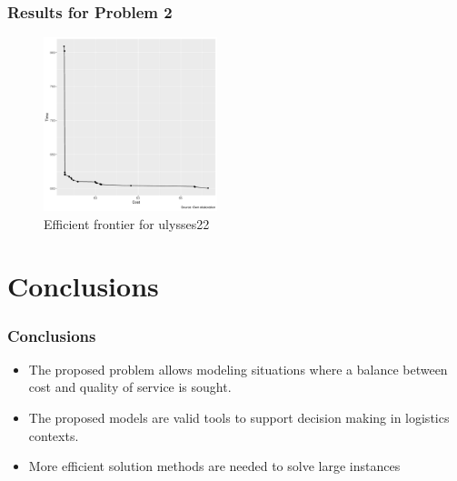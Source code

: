 \documentclass[aspectratio=169]{beamer}
\begin{document}
{\begin{frame}
\frametitle{Results for Problem 2}

\begin{figure}[ht]
\centering
\includegraphics[width=0.45\textwidth]{images/efficient-frontier:3.pdf}
\caption{Efficient frontier for ulysses22}
\end{figure}
\end{frame}
}


\section[Conclusions]{Conclusions}
\begin{frame}
\frametitle{Conclusions}
\begin{itemize}
\item The proposed problem allows modeling situations where a balance between cost and quality of service is sought.
\item The proposed models are valid tools to support decision making in logistics contexts.
\item More efficient solution methods are needed to solve large instances
\end{itemize}


\end{frame}
\end{document}
